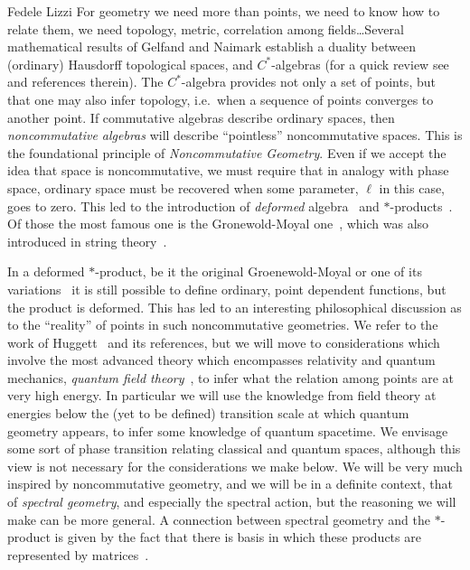 \begin{artengenv}{Fedele Lizzi}
For geometry we need more than points, we need to know how to relate them, we need topology, metric, correlation among fields\ldots  Several mathematical results of Gelfand and Naimark establish a duality between (ordinary) Hausdorff topological spaces, and $C^*$-algebras (for a quick review see~\cite[Chapt.~6]{WSS} and references therein). The $C^*$-algebra provides not only a set of points, but  that one may also infer topology, i.e.\ when a sequence of points converges to another point. If commutative algebras describe ordinary spaces, then \emph{noncommutative algebras} will describe ``pointless'' noncommutative spaces. This is the foundational principle of \emph{Noncommutative Geometry}. Even if we accept the idea that space is noncommutative, we must require that in analogy with phase space, ordinary space must be recovered when some parameter, $\ell$ in this case, goes to zero. This led to the introduction of \emph{deformed} algebra~\cite{Gerstenhaber} and $*$-products~\cite{starprod}. Of those the most famous one is the Gronewold-Moyal one~\cite{Gronewold,Moyal}, which was also introduced in string theory~\cite{FrohlichGawedski, LLS1, SeibergWitten}. 

In a deformed $*$-product, be it the original Groenewold-Moyal or one of its variations~\cite{GalluccioLizziVitale1, GalluccioLizziVitale2,TanasaVitale} it is still possible to define ordinary, point dependent functions, but the product is deformed. This has led to an interesting philosophical discussion as to the ``reality'' of points in such noncommutative geometries. We refer to the work of Huggett~\cite{Huggett} and its references, but we will move to considerations which involve the most advanced theory which encompasses relativity and quantum mechanics, \emph{quantum field theory}~\cite{Weinberg}, to infer what the relation among points are at very high energy. In particular we will use the knowledge from field theory at energies below the (yet to be defined) transition scale at which quantum geometry appears, to infer some knowledge of quantum spacetime. We  envisage some sort of phase transition relating classical and quantum spaces, although this view is not necessary for the considerations we make below.
We will be very much inspired by noncommutative geometry, and we will be in a definite context, that of \emph{spectral geometry}, and especially the spectral action, but the reasoning we will make can be more general. A connection between spectral geometry and the $*$-product  is given by the fact that there is basis in which these products are represented by matrices~\cite{LizziVitaleReview}.


\end{artengenv}
